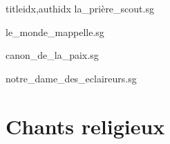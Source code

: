 \documentclass[12pt]{article}
\begin{document}
\begin{songs}{titleidx,authidx}
{la_prière_scout.sg}


{le_monde_mappelle.sg}


{canon_de_la_paix.sg}


{notre_dame_des_eclaireurs.sg}

\end{songs}

\part*{Chants religieux}
\end{document}
